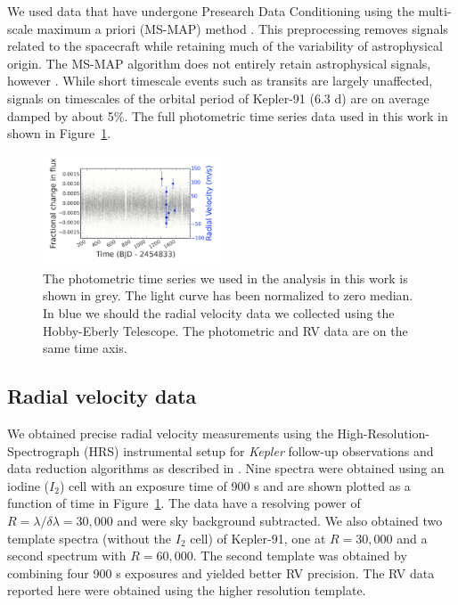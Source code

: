 \documentclass[apjl]{emulateapj}
\begin{document}
We used data that have undergone Presearch Data Conditioning \citep{stumpe12,smith12} using the multi-scale maximum a priori (MS-MAP) method \citep{stumpe14}. This preprocessing removes signals related to the spacecraft while retaining much of the variability of astrophysical origin. The MS-MAP algorithm does not entirely retain astrophysical signals, however \citep{DRN21}. While short timescale events such as transits are largely unaffected, signals on timescales of the orbital period of Kepler-91 (6.3 d) are on average damped by about 5\%. The full photometric time series data used in this work in shown in Figure~\ref{fig:fulllcrv}.


\begin{figure}
\includegraphics[width=0.47\textwidth]{full_lcrv.pdf}
\caption{The photometric time series we used in the analysis in this work is shown in grey. The light curve has been normalized to zero median. In blue we should the radial velocity data we collected using the Hobby-Eberly Telescope. The photometric and RV data are on the same time axis.}
\label{fig:fulllcrv}
\end{figure}




\subsection{Radial velocity data}
We obtained precise radial velocity measurements using the High-Resolution-Spectrograph (HRS) \citep{tull98}
instrumental setup for \emph{Kepler} follow-up observations and data reduction algorithms as described in \citet{endl11}. Nine spectra were obtained using an iodine ($I_2$) cell with an exposure time of 900 s and are shown plotted as a function of time in Figure~\ref{fig:fulllcrv}. The data have a resolving power of $R = \lambda/\delta\lambda = 30,000$ and were sky background subtracted. We also obtained two template spectra (without the $I_2$ cell) of Kepler-91, one at $R=30,000$ and a second spectrum with $R=60,000$. The second template was obtained by combining four 900 s exposures and yielded better RV precision. The RV data reported here were obtained using the higher resolution template.
\end{document}
